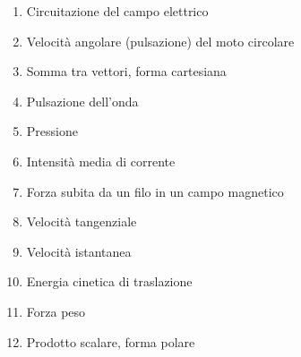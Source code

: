 \documentclass[a4paper,11pt,italian]{article}
\begin{document}
\begin{enumerate}
\item Circuitazione del campo elettrico
\item Velocità angolare (pulsazione) del moto circolare
\item Somma tra vettori, forma cartesiana
\item Pulsazione dell'onda
\item Pressione 
\item Intensità media di corrente
\item Forza subita da un filo in un campo magnetico
\item Velocità tangenziale
\item Velocità istantanea
\item Energia cinetica di traslazione
\item Forza peso
\item Prodotto scalare, forma polare
\end{enumerate}
\end{document}
